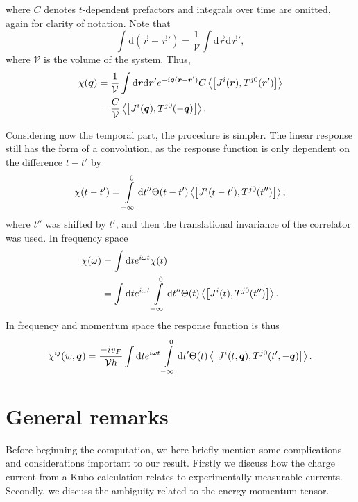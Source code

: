 where $C$ denotes $t$-dependent prefactors and integrals over time are omitted, again for clarity of notation.
Note that
\begin{equation}
  \int \mathrm{d}(\vec{r} - \vec{r}') = \frac{1}{\mathcal{V}} \int \mathrm{d}\vec{r} \mathrm{d} \vec{r}',
\end{equation}
where $\mathcal{V}$ is the volume of the system.
Thus,
\begin{equation}
  \begin{split}
    \chi (\vec{q}) &= \frac{1}{\mathcal{V}} \int \mathrm{d}\vec{r} \mathrm{d}\vec{r}'
    e^{-i\vec{q}(\vec{r}-\vec{r}')}
    C \Braket{\left[
        J^i(\vec{r}), T^{j 0}(\vec{r}')
      \right]}\\
    &= \frac{C}{\mathcal{V}} \Braket{\left[ J^i(\vec{q}), T^{j 0}(-\vec{q}) \right]}.
  \end{split}
\end{equation}

Considering now the temporal part, the procedure is simpler.
The linear response still has the form of a convolution, as the response function is only dependent on the difference $t-t'$ by
\begin{equation}
  \chi (t-t') = \int\limits_{-\infty }^0 \mathrm{d} t'' \Theta (t - t')
  \Braket{\left[ J^i(t-t'), T^{j0}(t'') \right]},
\end{equation}
where $t''$ was shifted by $t' $, and then the translational invariance of the correlator was used.
In frequency space
\begin{align}
  \chi (\omega ) &= \int \mathrm{d} t e^{i \omega  t} \chi (t)\\
                 &= \int \mathrm{d} t e^{i \omega  t} \int\limits_{-\infty  }^0 \mathrm{d} t''
                   \Theta (t) \Braket{\left[ J^i(t), T^{j 0}(t'') \right]}.
\end{align}
In frequency and momentum space the response function is thus
\begin{equation}\label{eq:22}
  \chi ^{ij} (w, \vec{q}) =
  \frac{-iv_F}{\mathcal{V} \hbar }
  \int \mathrm{d}t e^{i\omega t}
  \int\limits_{-\infty }^{0} \mathrm{d}t'
  \Theta (t)
  \Braket{\left[
      J^i(t, \vec{q}), T^{j 0}(t', -\vec{q})
    \right]}.
\end{equation}

\section{General remarks}
Before beginning the computation, we here briefly mention some complications and considerations important to our result.
Firstly we discuss how the charge current from a Kubo calculation relates to experimentally measurable currents.
Secondly, we discuss the ambiguity related to the energy-momentum tensor.

